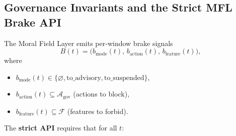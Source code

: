 \documentclass[11pt]{article}
\begin{document}
\subsection{Governance Invariants and the Strict MFL Brake API}
\label{sec:governance}
The Moral Field Layer emits per‑window brake signals
\[
  B(t) = \big( b_{\text{mode}}(t),\, b_{\text{action}}(t),\, b_{\text{feature}}(t) \big),
\]
where
\begin{itemize}
  \item $b_{\text{mode}}(t) \in \{\varnothing,\text{to\_advisory},\text{to\_suspended}\}$,
  \item $b_{\text{action}}(t) \subseteq \mathcal{A}_{\text{gov}}$ (actions to block),
  \item $b_{\text{feature}}(t) \subseteq \mathcal{F}$ (features to forbid).
\end{itemize}
The \textbf{strict API} requires that for all $t$:
\end{document}

